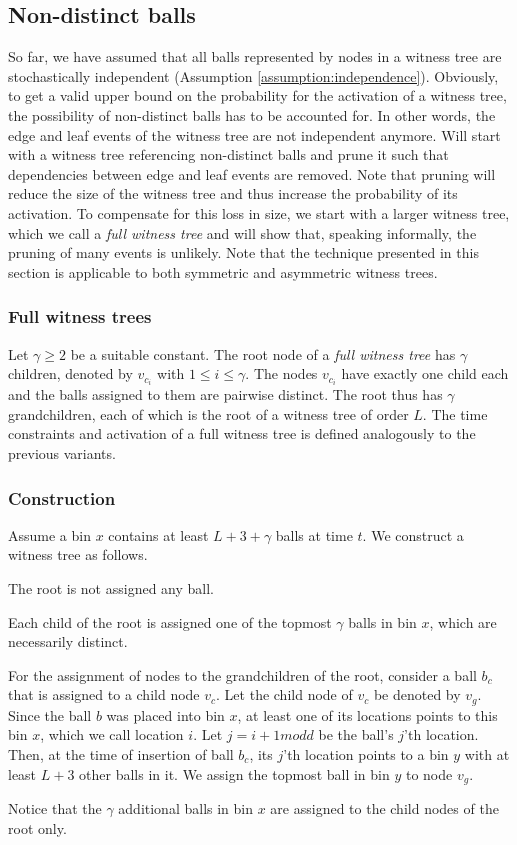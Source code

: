 \documentclass[a4paper,12pt]{article}
\begin{document}
\subsection{Non-distinct balls}
\label{sec:analysis:nondistinctBalls}
So far, we have assumed that all balls represented by nodes in a witness tree are stochastically independent (Assumption \ref{assumption:independence}). Obviously, to get a valid upper bound on the probability for the activation of a witness tree, the possibility of non-distinct balls has to be accounted for. In other words, the edge and leaf events of the witness tree are not independent anymore. Will start with a witness tree referencing non-distinct balls and prune it such that dependencies between edge and leaf events are removed. Note that pruning will reduce the size of the witness tree and thus increase the probability of its activation. To compensate for this loss in size, we start with a larger witness tree, which we call a \emph{full witness tree} and will show that, speaking informally, the pruning of many events is unlikely. Note that the technique presented in this section is applicable to both symmetric and asymmetric witness trees. 

\subsubsection{Full witness trees}
\label{sec:analysis:FullWT}
Let $\gamma \geq 2$ be a suitable constant. The root node of a \emph{full witness tree} has $\gamma$ children, denoted by $v_{c_i}$ with $1\leq i \leq \gamma$. The nodes $v_{c_i}$ have exactly one child each and the balls assigned to them are pairwise distinct. The root thus has $\gamma$ grandchildren, each of which is the root of a witness tree of order $L$. The time constraints and activation of a full witness tree is defined analogously to the previous variants.

\subsubsection{Construction}
\label{sec:analysis:constructionFullWT}
Assume a bin $x$ contains at least $L+3+\gamma$ balls at time $t$. We construct a witness tree as follows.
\begin{compactitem}
\item The root is not assigned any ball.
\item Each child of the root is assigned one of the topmost $\gamma$ balls in bin $x$, which are necessarily distinct.
\item For the assignment of nodes to the grandchildren of the root, consider a ball $b_c$ that is assigned to a child node $v_c$. Let the child node of $v_c$ be denoted by $v_g$. Since the ball $b$ was placed into bin $x$, at least one of its locations points to this bin $x$, which we call location $i$. Let $j = i+1 mod d$ be the ball's $j$'th location. Then, at the time of insertion of ball $b_c$, its $j$'th location points to a bin $y$ with at least $L+3$ other balls in it. We assign the topmost ball in bin $y$ to node $v_g$.
\end{compactitem}
Notice that the $\gamma$ additional balls in bin $x$ are assigned to the child nodes of the root only. 
\end{document}
